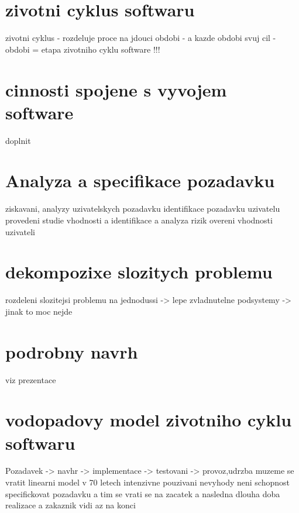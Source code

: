\documentclass{article}
\begin{document}
\section{zivotni cyklus softwaru}
zivotni cyklus - rozdeluje proce na jdouci obdobi
                - a kazde obdobi svuj cil
                - obdobi = etapa zivotniho cyklu software !!!
\section{cinnosti spojene s vyvojem software}
doplnit
\section{Analyza a specifikace pozadavku}
ziskavani, analyzy uzivatelskych pozadavku
identifikace pozadavku uzivatelu
provedeni studie vhodnosti a identifikace a analyza rizik
overeni vhodnosti uzivateli
\section{dekompozixe slozitych problemu}
rozdeleni slozitejsi problemu na jednodussi -> lepe zvladnutelne podsystemy
                                            -> jinak to moc nejde
\section{podrobny navrh}
    viz prezentace
\section{vodopadovy model zivotniho cyklu softwaru}
    Pozadavek -> navhr -> implementace -> testovani -> provoz,udrzba
    muzeme se vratit
    linearni model
    v 70 letech intenzivne pouzivani
    nevyhody neni schopnost specifickovat pozadavku a tim se vrati se na zacatek
    a nasledna dlouha doba realizace a zakaznik vidi az na konci
 
\end{document}
